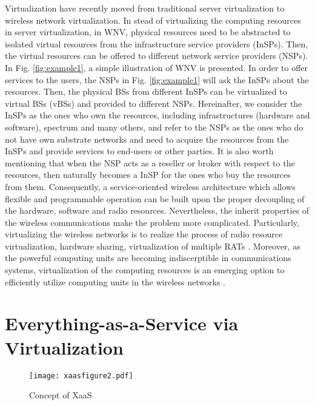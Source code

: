 \documentclass[12pt,draftclsnofoot,onecolumn]{IEEEtran}
\begin{document}
Virtualization have recently moved from traditional server
virtualization to wireless network virtualization. In stead of
virtualizing the computing resources in server virtualization, in
WNV, physical resources need to be abstracted to isolated virtual
resources from the infrastructure service providers (InSPs). Then,
the virtual resources can be offered to different network service
providers (NSPs). In Fig. \ref{fig:example1}, a simple
illustration of WNV is presented. In order to offer services to
the users, the NSPs in Fig. \ref{fig:example1} will ask the InSPs
about the resources. Then, the physical BSs from different InSPs
can be virtualized to virtual BSs (vBSs) and provided to different
NSPs. Hereinafter, we consider the InSPs as the ones who own the
resources, including infrastructures (hardware and software),
spectrum and many others, and refer to the NSPs as the ones who do
not have own substrate networks and need to acquire the resources
from the InSPs and provide services to end-users or other parties.
It is also worth mentioning that when the NSP acts as a reseller
or broker with respect to the resources, then naturally becomes a
InSP for the ones who buy the resources from them. Consequently, a
service-oriented wireless architecture which allows flexible and
programmable operation can be built upon the proper decoupling of
the hardware, software and radio resources. Nevertheless, the
inherit properties of the wireless communications make the problem
more complicated. Particularly, virtualizing the wireless networks
is to realize the process of radio resource virtualization,
hardware sharing, virtualization of multiple RATs \cite{Liang}.
Moreover, as the powerful computing units are becoming
indiscerptible in communications systems, virtualization of the
computing resources is an emerging option to efficiently utilize
computing units in the wireless networks \cite{Wen}.\par


\section{Everything-as-a-Service via Virtualization}

\begin{figure}[t]
\centering
\texttt{[image: xaasfigure2.pdf]}
\caption{Concept of XaaS} \label{fig:xaas}
\end{figure}
\end{document}
